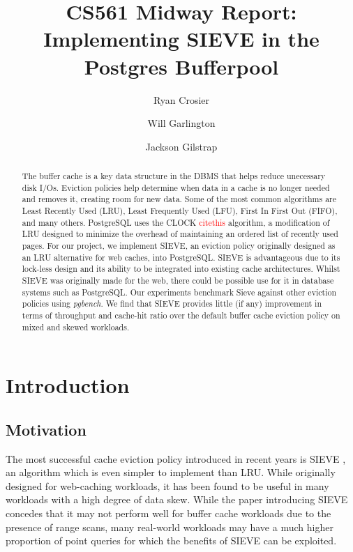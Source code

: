 \documentclass[sigconf]{acmart}
\def\bad#1{\textcolor{red}{#1}}
\begin{document}
\title{CS561 Midway Report: Implementing SIEVE in the Postgres Bufferpool}

\author{Ryan Crosier}
\author{Will Garlington}
\author{Jackson Gilstrap}

\begin{abstract}
    The buffer cache is a key data structure in the DBMS that helps reduce unecessary disk I/Os. Eviction policies help determine when data in a cache is no longer needed and removes it, creating room for new data. Some of the most common algorithms are Least Recently Used (LRU), Least Frequently Used (LFU), First In First Out (FIFO), and many others. PostgreSQL uses the CLOCK \bad{citethis} algorithm, a modification of LRU designed to minimize the overhead of maintaining an ordered list of recently used pages. For our project, we implement SIEVE, an eviction policy originally designed as an LRU alternative for web caches, into PostgreSQL. SIEVE is advantageous due to its lock-less design and its ability to be integrated into existing cache architectures. Whilst SIEVE was originally made for the web, there could be possible use for it in database systems such as PostgreSQL. Our experiments benchmark Sieve against other eviction policies using \textit{pgbench}. We find that SIEVE provides little (if any) improvement in terms of throughput and cache-hit ratio over the default buffer cache eviction policy on mixed and skewed workloads.
\end{abstract}

\maketitle

\section{Introduction}

\subsection{Motivation}

The most successful cache eviction policy introduced in recent years is SIEVE \cite{SIEVE}, an algorithm which is even simpler to implement than LRU. While originally designed for web-caching workloads, it has been found to be useful in many workloads with a high degree of data skew. While the paper introducing SIEVE concedes that it may not perform well for buffer cache workloads due to the presence of range scans, many real-world workloads may have a much higher proportion of point queries for which the benefits of SIEVE can be exploited.
\end{document}
